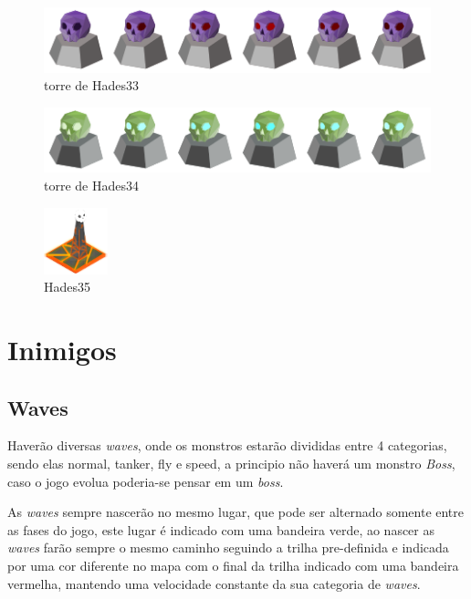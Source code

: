 \documentclass[11pt]{article} %
\begin{document}
\begin{figure}[!htp]
\centering
\advance\leftskip-3cm
\advance\rightskip-3cm
\includegraphics[scale=1.3]{res/towers/tower_33.png}
\caption{torre de Hades33}
\end{figure}


\begin{figure}[!htp]
\centering
\advance\leftskip-3cm
\advance\rightskip-3cm
\includegraphics[scale=1.3]{res/towers/tower_34.png}
\caption{torre de Hades34}
\end{figure}


\begin{figure}[!htp]
\centering
\includegraphics[scale=1.3]{res/towers/tower_35.png}
\caption{Hades35}
\end{figure}


\section{Inimigos}
\subsection{Waves} 

Haverão diversas \textit{waves}, onde os monstros estarão divididas entre 4 categorias, sendo elas normal, tanker, fly e  speed, a principio não haverá um monstro \textit{Boss}, caso o jogo evolua poderia-se pensar em um \textit{boss}.

As \textit{waves} sempre nascerão no mesmo lugar, que pode ser alternado somente entre as fases do jogo, este lugar é indicado com uma bandeira verde, ao nascer as \textit{waves} farão sempre o mesmo caminho seguindo a trilha pre-definida e indicada por uma cor diferente no mapa com o final da trilha indicado com uma bandeira vermelha, mantendo uma velocidade constante da sua categoria de \textit{waves}. 
\end{document}
